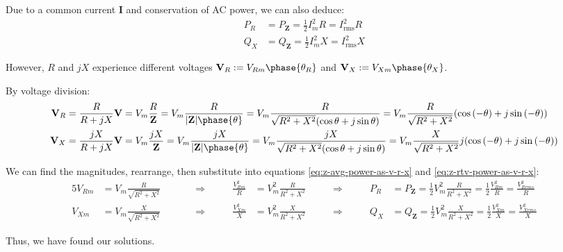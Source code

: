 \documentclass{article}
\begin{document}
Due to a common current $\mathbf{I}$ and conservation of AC power, we can also deduce:
\begin{subequations}
\begin{align*}
    P_R &= P_{\mathbf{Z}} = \frac{1}{2} I_m^2 R = I_{\text{rms}}^2 R \\
    Q_X &= Q_{\mathbf{Z}} = \frac{1}{2} I_m^2 X = I_{\text{rms}}^2 X
\end{align*}
\end{subequations}

However, $R$ and $jX$ experience different voltages $\mathbf{V}_R := V_{Rm} \phase{\theta_R}$ and $\mathbf{V}_X := V_{Xm} \phase{\theta_X}$.

By voltage division:
\begin{align*}
    \mathbf{V}_R
        &= \frac{R}{R + jX} \mathbf{V}
        = V_m \frac{R}{\mathbf{Z}}
        = V_m \frac{R}{\abs*{\mathbf{Z}} \phase{\theta}}
        = V_m \frac{R}{\sqrt{R^2 + X^2} \parens*{\cos{\theta} + j \sin{\theta}}}
        = V_m \frac{R}{\sqrt{R^2 + X^2}} \parens*{\cos{(-\theta)} + j \sin{(-\theta)}}
        \\
    \mathbf{V}_X
        &= \frac{jX}{R + jX} \mathbf{V}
        = V_m \frac{jX}{\mathbf{Z}}
        = V_m \frac{jX}{\abs*{\mathbf{Z}} \phase{\theta}}
        = V_m \frac{jX}{\sqrt{R^2 + X^2} \parens*{\cos{\theta} + j \sin{\theta}}}
        = V_m \frac{X}{\sqrt{R^2 + X^2}} j \parens*{\cos{(-\theta)} + j \sin{(-\theta)}}
        \\
\end{align*}

We can find the magnitudes, rearrange, then substitute into equations \eqref{eq:z-avg-power-as-v-r-x} and \eqref{eq:z-rtv-power-as-v-r-x}:
\begin{alignat*}{5}
    V_{Rm} &= V_m \frac{R}{\sqrt{R^2 + X^2}} &
        \qquad & \Longrightarrow \qquad &
        \frac{V_{Rm}^2}{R} &= V_m^2 \frac{R}{R^2 + X^2}
        \qquad & \Longrightarrow \qquad &
        P_R &= P_{\mathbf{Z}} = \frac{1}{2} V_m^2 \frac{R}{R^2 + X^2} = \frac{1}{2} \frac{V_{Rm}^2}{R} = \frac{V_{Rrms}^2}{R}
        \\
    V_{Xm} &= V_m \frac{X}{\sqrt{R^2 + X^2}} &
        \qquad & \Longrightarrow \qquad &
        \frac{V_{Xm}^2}{X} &= V_m^2 \frac{X}{R^2 + X^2}
        \qquad & \Longrightarrow \qquad &
        Q_X &= Q_{\mathbf{Z}} = \frac{1}{2} V_m^2 \frac{X}{R^2 + X^2} = \frac{1}{2} \frac{V_{Xm}^2}{X} = \frac{V_{Xrms}^2}{X}
\end{alignat*}

Thus, we have found our solutions.
\end{document}
